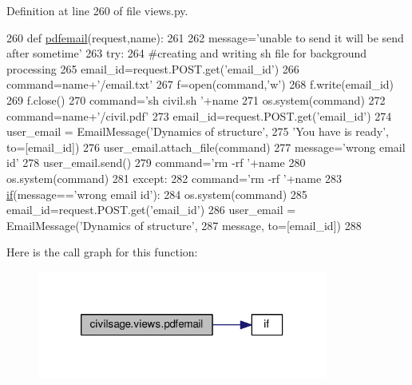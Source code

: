 Definition at line 260 of file views.\+py.


\begin{DoxyCode}
260 \textcolor{keyword}{def }\hyperlink{namespacecivilsage_1_1views_a9914ff19f8e15ccab1a07eaeac8cfb21}{pdfemail}(request,name):
261 
262     message=\textcolor{stringliteral}{'unable to send it will be send after sometime'}
263     \textcolor{keywordflow}{try}:
264         \textcolor{comment}{#creating and writing sh file for background processing}
265         email\_id=request.POST.get(\textcolor{stringliteral}{'email\_id'})
266         command=name+\textcolor{stringliteral}{'/email.txt'}
267         f=open(command,\textcolor{stringliteral}{'w'})
268         f.write(email\_id)
269         f.close()
270         command=\textcolor{stringliteral}{'sh  civil.sh '}+name
271         os.system(command)
272         command=name+\textcolor{stringliteral}{'/civil.pdf'}
273         email\_id=request.POST.get(\textcolor{stringliteral}{'email\_id'})
274         user\_email = EmailMessage(\textcolor{stringliteral}{'Dynamics of structure'},
275         \textcolor{stringliteral}{'You have is ready'}, to=[email\_id])
276         user\_email.attach\_file(command)
277         message=\textcolor{stringliteral}{'wrong email id'}
278         user\_email.send()
279         command=\textcolor{stringliteral}{'rm -rf '}+name
280         os.system(command)
281     \textcolor{keywordflow}{except}:
282         command=\textcolor{stringliteral}{'rm -rf '}+name
283         \hyperlink{bootstrap_8min_8js_ac2d69f5011896c6ed4a54e0dd36f6334}{if}(message==\textcolor{stringliteral}{'wrong email id'}):
284                     os.system(command)
285                 email\_id=request.POST.get(\textcolor{stringliteral}{'email\_id'})
286         user\_email = EmailMessage(\textcolor{stringliteral}{'Dynamics of structure'},
287         message, to=[email\_id])
288 
\end{DoxyCode}


Here is the call graph for this function\+:
\nopagebreak
\begin{figure}[H]
\begin{center}
\leavevmode
\includegraphics[width=270pt]{namespacecivilsage_1_1views_a9914ff19f8e15ccab1a07eaeac8cfb21_cgraph}
\end{center}
\end{figure}


